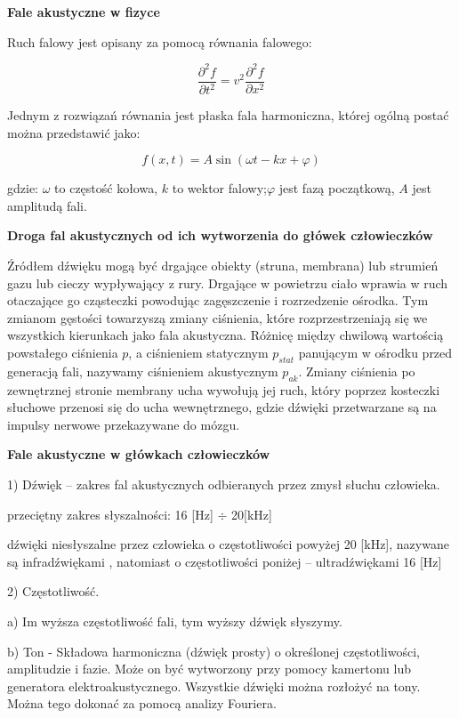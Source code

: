 \documentclass{article}
\begin{document}
\begin{enumerate}
{\bf Fale akustyczne w fizyce}

Ruch falowy jest opisany za pomocą równania falowego:

$$\frac{\partial^2f}{\partial t^2} = v^2\frac{\partial^2f}{\partial x^2}$$


Jednym z rozwiązań równania jest płaska fala harmoniczna, której ogólną postać można przedstawić jako:

$$f(x,t) = A\sin(\omega t-kx+\varphi)$$


gdzie: $\omega$ to częstość kołowa, $k$  to wektor falowy;$\varphi$  jest fazą początkową, $A$ jest amplitudą fali.





{\bf Droga fal akustycznych od ich wytworzenia do główek człowieczków}

Źródłem dźwięku mogą być drgające obiekty (struna, membrana) lub strumień gazu lub cieczy wypływający z rury. Drgające w powietrzu ciało wprawia w ruch otaczające go cząsteczki powodując zagęszczenie i rozrzedzenie ośrodka. Tym zmianom gęstości towarzyszą zmiany ciśnienia, które rozprzestrzeniają się we wszystkich kierunkach jako fala akustyczna. Różnicę między chwilową wartością powstałego ciśnienia $p$, a ciśnieniem statycznym $p_{stat}$ panującym w ośrodku przed generacją fali, nazywamy ciśnieniem akustycznym $p_{ak}$. Zmiany ciśnienia po zewnętrznej stronie membrany ucha wywołują jej ruch, który poprzez kosteczki słuchowe przenosi się do ucha wewnętrznego, gdzie dźwięki przetwarzane są na impulsy nerwowe przekazywane do mózgu. 





{\bf Fale akustyczne w główkach człowieczków}


1) Dźwięk – zakres fal akustycznych odbieranych przez zmysł słuchu człowieka. 

przeciętny zakres słyszalności:  16 [Hz] $\div$ 20[kHz]

dźwięki niesłyszalne przez człowieka o częstotliwości powyżej 20 [kHz], nazywane są infradźwiękami , natomiast o częstotliwości poniżej – ultradźwiękami 16 [Hz]

2) Częstotliwość.

a) Im wyższa częstotliwość fali, tym wyższy dźwięk słyszymy. 

b) Ton - Składowa harmoniczna (dźwięk prosty) o określonej częstotliwości, amplitudzie i fazie. Może on być wytworzony przy pomocy kamertonu lub generatora elektroakustycznego. Wszystkie dźwięki można rozłożyć na tony. Można tego dokonać za pomocą analizy Fouriera.


\end{enumerate}
\end{document}
